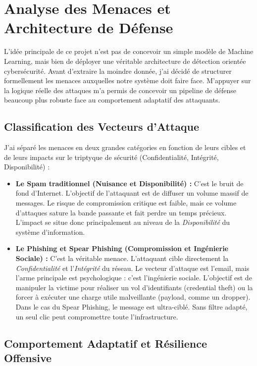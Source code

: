 \section{Analyse des Menaces et Architecture de Défense}

L'idée principale de ce projet n'est pas de concevoir un simple modèle de Machine Learning, mais bien de déployer une véritable architecture de détection orientée cybersécurité. Avant d'extraire la moindre donnée, j'ai décidé de structurer formellement les menaces auxquelles notre système doit faire face. M'appuyer sur la logique réelle des attaques m'a permis de concevoir un pipeline de défense beaucoup plus robuste face au comportement adaptatif des attaquants.

\subsection{Classification des Vecteurs d'Attaque}

J'ai séparé les menaces en deux grandes catégories en fonction de leurs cibles et de leurs impacts sur le triptyque de sécurité (Confidentialité, Intégrité, Disponibilité) :

\begin{itemize}
    \item \textbf{Le Spam traditionnel (Nuisance et Disponibilité) :} C'est le bruit de fond d'Internet. L'objectif de l'attaquant est de diffuser un volume massif de messages. Le risque de compromission critique est faible, mais ce volume d'attaques sature la bande passante et fait perdre un temps précieux. L'impact se situe donc principalement au niveau de la \textit{Disponibilité} du système d'information.
    \item \textbf{Le Phishing et Spear Phishing (Compromission et Ingénierie Sociale) :} C'est la véritable menace. L'attaquant cible directement la \textit{Confidentialité} et l'\textit{Intégrité} du réseau. Le vecteur d'attaque est l'email, mais l'arme principale est psychologique : c'est l'ingénierie sociale. L'objectif est de manipuler la victime pour réaliser un vol d'identifiants (credential theft) ou la forcer à exécuter une charge utile malveillante (payload, comme un dropper). Dans le cas du Spear Phishing, le message est ultra-ciblé. Sans filtre adapté, un seul clic peut compromettre toute l'infrastructure.
\end{itemize}

\subsection{Comportement Adaptatif et Résilience Offensive}

